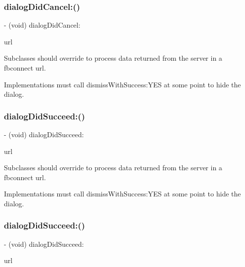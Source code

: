 \subsubsection{\texorpdfstring{dialog\+Did\+Cancel\+:()}{dialogDidCancel:()}\hspace{0.1cm}{\footnotesize\ttfamily [2/2]}}
{\footnotesize\ttfamily -\/ (void) dialog\+Did\+Cancel\+: \begin{DoxyParamCaption}\item[{(N\+S\+U\+RL $\ast$)}]{url }\end{DoxyParamCaption}}

Subclasses should override to process data returned from the server in a \textquotesingle{}fbconnect\textquotesingle{} url.

Implementations must call dismiss\+With\+Success\+:Y\+ES at some point to hide the dialog. \mbox{\label{interfaceFBDialog_a038587c0962d2dbda704f151d45eb6d3}} 
\subsubsection{\texorpdfstring{dialog\+Did\+Succeed\+:()}{dialogDidSucceed:()}\hspace{0.1cm}{\footnotesize\ttfamily [1/2]}}
{\footnotesize\ttfamily -\/ (void) dialog\+Did\+Succeed\+: \begin{DoxyParamCaption}\item[{(N\+S\+U\+RL $\ast$)}]{url }\end{DoxyParamCaption}}

Subclasses should override to process data returned from the server in a \textquotesingle{}fbconnect\textquotesingle{} url.

Implementations must call dismiss\+With\+Success\+:Y\+ES at some point to hide the dialog. \mbox{\label{interfaceFBDialog_a038587c0962d2dbda704f151d45eb6d3}} 
\subsubsection{\texorpdfstring{dialog\+Did\+Succeed\+:()}{dialogDidSucceed:()}\hspace{0.1cm}{\footnotesize\ttfamily [2/2]}}
{\footnotesize\ttfamily -\/ (void) dialog\+Did\+Succeed\+: \begin{DoxyParamCaption}\item[{(N\+S\+U\+RL $\ast$)}]{url }\end{DoxyParamCaption}}

